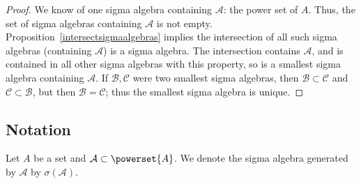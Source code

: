 \begin{proof}We know of one sigma algebra containing $\mathcal{A} $: the power set of $A$.
Thus, the set of sigma algebras containing $\mathcal{A} $ is not empty.
Proposition~\ref{intersectsigmaalgebras} implies the intersection of all such sigma algebras (containing $\mathcal{A} $) is a sigma algebra.
The intersection contains $\mathcal{A} $, and is contained in all other sigma algebras with this property, so is a smallest sigma algebra containing $\mathcal{A} $.
If $\mathcal{B} , \mathcal{C} $ were two smallest sigma algebras, then $\mathcal{B}  \subset \mathcal{C} $ and $\mathcal{C}  \subset \mathcal{B} $, but then $\mathcal{B}  = \mathcal{C} $; thus the smallest sigma algebra is unique.
\end{proof}
\subsection*{Notation}

Let $A$ be a set and $\mathcal{A}  \subset \powerset{A}$.
We denote the sigma algebra generated by $\mathcal{A} $ by $\sigma (\mathcal{A} )$.
